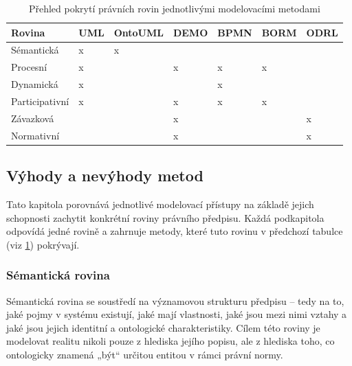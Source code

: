 \begin{table}[H]
  \centering
  \renewcommand{\arraystretch}{1.3}
  \begin{tabular}{|p{2.4cm}|p{1.1cm}|p{2cm}|p{1.3cm}|p{1.3cm}|p{1.3cm}|p{1.3cm}|}
  \hline
  \textbf{Rovina} & \textbf{UML} & \textbf{OntoUML} & \textbf{DEMO} & \textbf{BPMN} & \textbf{BORM} & \textbf{ODRL} \\
  \hline
  Sémantická       & x & x &   &   &   &   \\
  \hline
  Procesní         & x &   & x & x & x &   \\
  \hline
  Dynamická        & x &   &   & x &   &   \\
  \hline
  Participativní   & x &   & x & x & x &   \\
  \hline
  Závazková        &   &   & x &   &   & x \\
  \hline
  Normativní       &   &   & x &   &   & x \\
  \hline
  \end{tabular}
  \caption{Přehled pokrytí právních rovin jednotlivými modelovacími metodami}
  \label{tab:prehled-pokryti}
\end{table}


\subsection{Výhody a nevýhody metod}
\label{sec:vyhody-a-nevyhody-metod}
Tato kapitola porovnává jednotlivé modelovací přístupy na základě jejich schopnosti zachytit konkrétní roviny právního předpisu. Každá podkapitola odpovídá jedné rovině a zahrnuje metody, které tuto rovinu v předchozí tabulce (viz \ref{tab:prehled-pokryti}) pokrývají.


\subsubsection{Sémantická rovina}
\label{sec:semanticka-rovina}
Sémantická rovina se soustředí na významovou strukturu předpisu – tedy na to, jaké pojmy v systému existují, jaké mají vlastnosti, jaké jsou mezi nimi vztahy a jaké jsou jejich identitní a ontologické charakteristiky. Cílem této roviny je modelovat realitu nikoli pouze z hlediska jejího popisu, ale z hlediska toho, co ontologicky znamená „být“ určitou entitou v rámci právní normy.


